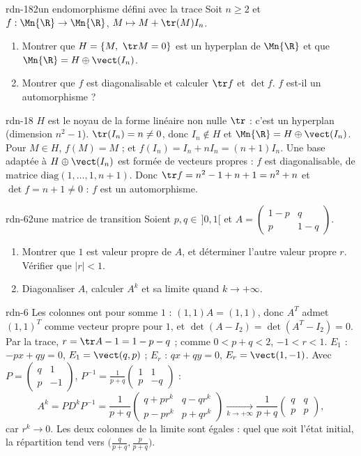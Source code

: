 \begin{exo}{rdn-18}{2}{un endomorphisme défini avec la trace}
Soit $n\geq2$ et $f:\Mn{\R}\to\Mn{\R}$, $M\mapsto M+\tr(M)I_n$.
\begin{enumerate}
\item Montrer que $H=\{M,\ \tr M=0\}$ est un hyperplan de $\Mn{\R}$ et que $\Mn{\R}=H\oplus\vect(I_n)$.
\item Montrer que $f$ est diagonalisable et calculer $\tr f$ et $\det f$. $f$ est-il un automorphisme ?
\end{enumerate}
\end{exo}
\begin{corrige}{rdn-18}
 $H$ est le noyau de la forme linéaire non nulle $\tr$ : c'est un hyperplan (dimension $n^2-1$). $\tr(I_n)=n\neq0$, donc
$I_n\notin H$ et $\Mn{\R}=H\oplus\vect(I_n)$.
 Pour $M\in H$, $f(M)=M$ ; et $f(I_n)=I_n+nI_n=(n+1)I_n$. Une base adaptée à $H\oplus\vect(I_n)$ est formée de vecteurs
propres : $f$ est diagonalisable, de matrice $\mathrm{diag}(1,\dots,1,n+1)$. Donc $\tr f=n^2-1+n+1=n^2+n$ et $\det f=n+1\neq0$ :
$f$ est un automorphisme.
\end{corrige}

\begin{exo}{rdn-6}{2}{une matrice de transition}
Soient $p,q\in\,]0,1[$ et $A=\begin{pmatrix}1-p&q\\p&1-q\end{pmatrix}$.
\begin{enumerate}
\item Montrer que $1$ est valeur propre de $A$, et déterminer l'autre valeur propre $r$. Vérifier que $|r|<1$.
\item Diagonaliser $A$, calculer $A^k$ et sa limite quand $k\to+\infty$.
\end{enumerate}
\end{exo}
\begin{corrige}{rdn-6}
 Les colonnes ont pour somme $1$ : $(1,1)A=(1,1)$, donc $A^T$ admet $(1,1)^T$ comme vecteur propre pour $1$, et
$\det(A-I_2)=\det(A^T-I_2)=0$. Par la trace, $r=\tr A-1=1-p-q$ ; comme $0<p+q<2$, $-1<r<1$.
 $E_1$ : $-px+qy=0$, $E_1=\vect(q,p)$ ; $E_r$ : $qx+qy=0$, $E_r=\vect(1,-1)$. Avec $P=\begin{pmatrix}q&1\\p&-1\end{pmatrix}$,
$P^{-1}=\frac1{p+q}\begin{pmatrix}1&1\\p&-q\end{pmatrix}$ :
\[A^k=PD^kP^{-1}=\frac1{p+q}\begin{pmatrix}q+pr^k&q-qr^k\\p-pr^k&p+qr^k\end{pmatrix}\xrightarrow[k\to+\infty]{}\frac1{p+q}\begin{pmatrix}q&q\\p&p\end{pmatrix},\]
car $r^k\to0$. Les deux colonnes de la limite sont égales : quel que soit l'état initial, la répartition tend vers $\big(\frac q{p+q},\frac p{p+q}\big)$.
\end{corrige}

